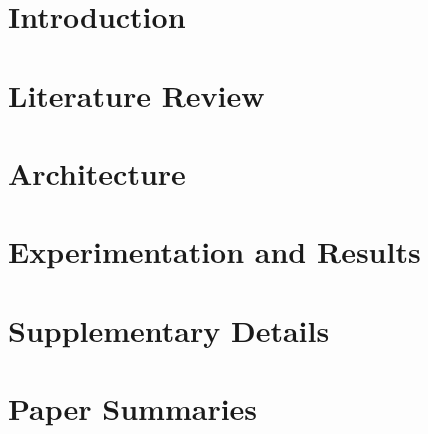 \documentclass[]{book}
\begin{document}


\tableofcontents


\chapter{Introduction}






\chapter{Literature Review}



\chapter{Architecture}




\chapter{Experimentation and Results}


\appendix
{}


\chapter{Supplementary Details}


\chapter{Paper Summaries}

\newpage

\newpage

\newpage

\newpage

\newpage

\newpage

\newpage

\newpage

\newpage


\newpage
\thispagestyle{empty}
\listoffigures
\listoftables


\newpage


\end{document}
